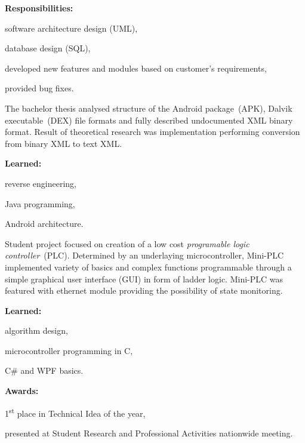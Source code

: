 \documentclass[a4paper]{deedy-resume}
\begin{document}
\begin{minipage}[t]{0.66\textwidth}
\vspace{\topsep}
\textbf{Responsibilities:}
\begin{tightitemize}
    \item software architecture design (UML),
    \item database design (SQL),
    \item developed new features and modules based on customer's requirements,
    \item provided bug fixes.
\end{tightitemize}
\sectionspace
\vspace{\topsep}
The bachelor thesis analysed structure of the Android package~(APK), Dalvik executable~(DEX) file formats and fully described undocumented XML binary format.
Result of theoretical research was implementation performing conversion from binary XML to text XML.

\vspace{\topsep}
\textbf{Learned:}
\begin{tightitemize}
    \item reverse engineering,
    \item Java programming,
    \item Android architecture.
\end{tightitemize}
\sectionspace
\end{minipage}
\begin{minipage}[t]{0.66\textwidth} %
\vspace{\topsep}
Student project focused on creation of a low cost \textit{programable logic controller}~(PLC).
Determined by an underlaying microcontroller, Mini-PLC implemented variety of basics and complex functions programmable through a simple graphical user interface (GUI) in form of ladder logic.
Mini-PLC was featured with ethernet module providing the possibility of state monitoring.

\vspace{\topsep}
\textbf{Learned:}
\vspace{\topsep}
\begin{tightitemize}
    \item algorithm design,
    \item microcontroller programming in C,
    \item C\# and WPF basics.
\end{tightitemize}
\vspace{\topsep}
\textbf{Awards:}
\begin{tightitemize}
    \item 1\textsuperscript{st} place in Technical Idea of the year,
    \item presented at Student Research and Professional Activities nationwide meeting.
\end{tightitemize}
\end{minipage}
\end{document}
